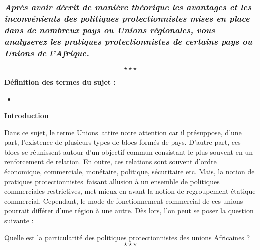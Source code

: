 
\newpage %
	\subsubsection*{\textit{Après avoir décrit de manière théorique les avantages et les inconvénients des politiques protectionnistes mises en place dans de nombreux pays ou Unions régionales, vous analyserez les pratiques protectionnistes de certains pays ou Unions de l'Afrique.}}
$$\star \star \star$$

\noindent \textbf{Définition des termes du sujet :}

\begin{itemize}
	\item 
\end{itemize}

\begin{center}
	\textbf{\underline{Introduction}} 
\end{center}

Dans ce sujet, le terme \guillemetleft Unions\guillemetright\ attire notre attention car il présuppose, d'une part, l'existence de plusieurs types de blocs formés de pays. D'autre part, ces blocs se réunissent autour d'un objectif commun consistant le plus souvent en un renforcement de relation. En outre, ces relations sont souvent d'ordre économique, commerciale, monétaire, politique, sécuritaire etc. Mais, la notion de \guillemetleft pratiques protectionnistes\guillemetright\ faisant allusion à un ensemble de politiques commerciales restrictives, met mieux en avant la notion de regroupement étatique commercial. Cependant, le mode de fonctionnement commercial de ces unions pourrait différer d'une région à une autre. Dès lors, l'on peut se poser la question suivante :

Quelle est la particularité des politiques protectionnistes des unions Africaines ? $$\star \star \star$$

